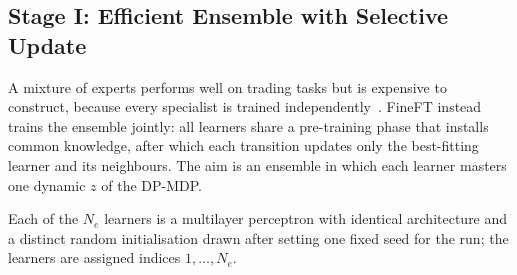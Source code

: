 \subsection{Stage I: Efficient Ensemble with Selective Update}
\label{sec:fineft_stage1}

A mixture of experts performs well on trading tasks but is expensive to construct, because every specialist is trained independently~\cite{qin2024earnhft,sun2023mastering}. FineFT instead trains the ensemble jointly: all learners share a pre-training phase that installs common knowledge, after which each transition updates only the best-fitting learner and its neighbours. The aim is an ensemble in which each learner masters one dynamic $z$ of the DP-MDP.

Each of the $N_e$ learners is a multilayer perceptron with identical architecture and a distinct random initialisation drawn after setting one fixed seed for the run; the learners are assigned indices $1,\dots,N_e$.

